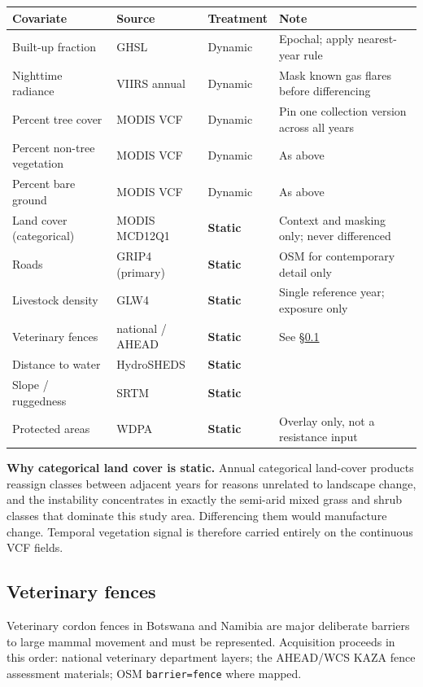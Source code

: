 \begin{center}
\small
\begin{tabular}{@{}p{4.6cm}p{2.4cm}p{2.0cm}p{5.2cm}@{}}
\toprule
Covariate & Source & Treatment & Note \\
\midrule
Built-up fraction & GHSL & Dynamic & Epochal; apply nearest-year rule \\
Nighttime radiance & VIIRS annual & Dynamic & Mask known gas flares before differencing \\
Percent tree cover & MODIS VCF & Dynamic & Pin one collection version across all years \\
Percent non-tree vegetation & MODIS VCF & Dynamic & As above \\
Percent bare ground & MODIS VCF & Dynamic & As above \\
Land cover (categorical) & MODIS MCD12Q1 & \textbf{Static} & Context and masking only; never differenced \\
Roads & GRIP4 (primary) & \textbf{Static} & OSM for contemporary detail only \\
Livestock density & GLW4 & \textbf{Static} & Single reference year; exposure only \\
Veterinary fences & national / AHEAD & \textbf{Static} & See \S\ref{sec:fences} \\
Distance to water & HydroSHEDS & \textbf{Static} & \\
Slope / ruggedness & SRTM & \textbf{Static} & \\
Protected areas & WDPA & \textbf{Static} & Overlay only, not a resistance input \\
\bottomrule
\end{tabular}
\end{center}

\textbf{Why categorical land cover is static.} Annual categorical land-cover
products reassign classes between adjacent years for reasons unrelated to
landscape change, and the instability concentrates in exactly the semi-arid
mixed grass and shrub classes that dominate this study area. Differencing them
would manufacture change. Temporal vegetation signal is therefore carried
entirely on the continuous VCF fields.

\subsection{Veterinary fences}
\label{sec:fences}

Veterinary cordon fences in Botswana and Namibia are major deliberate barriers
to large mammal movement and must be represented. Acquisition proceeds in this
order: national veterinary department layers; the AHEAD/WCS KAZA fence
assessment materials; OSM \texttt{barrier=fence} where mapped.

